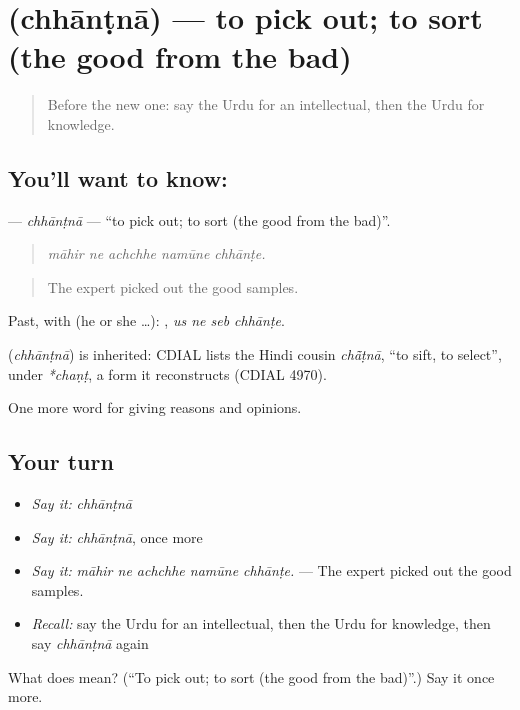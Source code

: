 \section[\texorpdfstring{\ur{چھانٹنا} (chhānṭnā)}{چھانٹنا (chhānṭnā)}]{ (chhānṭnā) — to pick out; to sort (the good from the bad)}

\label{lesson:UR-C352-chhantna}



\begin{quote}
Before the new one: say the Urdu for an intellectual, then the Urdu for knowledge.
\end{quote}

\subsection*{You'll want to know: }
\textbf{} — \emph{chhānṭnā} — \textquotedblleft{}to pick out; to sort (the good from the bad)\textquotedblright{}.

\begin{quote}
    
\end{quote}

\begin{quote}
\emph{māhir ne achchhe namūne chhānṭe.}
\end{quote}

\begin{quote}
The expert picked out the good samples.
\end{quote}

Past, with  (he or she …):    , \emph{us ne seb chhānṭe}.

\begin{cousinweb}
\textbf{} (\emph{chhānṭnā}) is inherited: CDIAL lists the Hindi cousin \emph{chā̃ṭnā}, \textquotedblleft{}to sift, to select\textquotedblright{}, under \emph{*chaṇṭ}, a form it reconstructs (CDIAL 4970).
\end{cousinweb}

\begin{grammarlens}[title={What you've built}]
One more word for giving reasons and opinions.
\end{grammarlens}

\subsection*{Your turn}
\begin{itemize}
\raggedright
  \item \emph{Say it:} \emph{chhānṭnā}
  \item \emph{Say it:} \emph{chhānṭnā}, once more
  \item \emph{Say it:} \emph{māhir ne achchhe namūne chhānṭe.} — The expert picked out the good samples.
  \item \emph{Recall:} say the Urdu for an intellectual, then the Urdu for knowledge, then say \emph{chhānṭnā} again
\end{itemize}

\begin{tcolorbox}[breakable,colback=teal!4,colframe=teal!35!black,title={Before you move on}]
What does  mean? (\textquotedblleft{}To pick out; to sort (the good from the bad)\textquotedblright{}.) Say it once more.
\end{tcolorbox}
